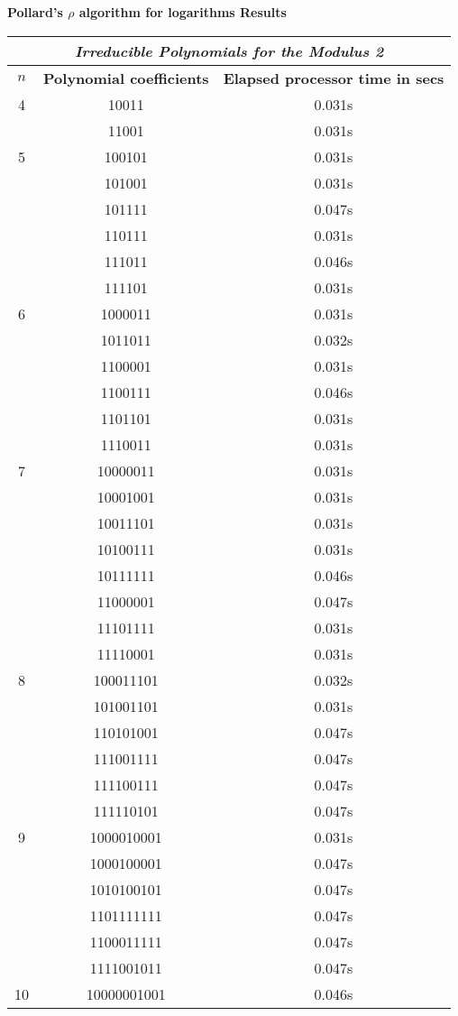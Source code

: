 \documentclass[iwp,first]{luthesis}
\begin{document}
\newpage

\textbf{Pollard's $\rho$ algorithm for logarithms Results}
\\
\begin{center}
\begin{tabular}{|c|c|c|}
\hline
\multicolumn{3}{|c|}{\textit{Irreducible Polynomials for the Modulus 2}} \\
\hline
\textbf{$n$} & \textbf{Polynomial coefficients} & \textbf{Elapsed processor time in secs} \\ \hline
4 & 10011 & 0.031s  \\ 
 & 11001 & 0.031s \\ \hline
5 & 100101 & 0.031s \\ 
 & 101001 & 0.031s \\
 & 101111 & 0.047s \\
 & 110111 & 0.031s \\
 & 111011 & 0.046s \\
 & 111101 & 0.031s \\ \hline
6 & 1000011 & 0.031s \\
 & 1011011 & 0.032s\\
 & 1100001 & 0.031s \\
 & 1100111 & 0.046s \\
 & 1101101 & 0.031s \\
 & 1110011 & 0.031s \\ \hline
7 & 10000011 & 0.031s \\
 & 10001001 & 0.031s \\
 & 10011101 & 0.031s \\
 & 10100111 & 0.031s \\
 & 10111111 & 0.046s \\
 & 11000001 & 0.047s \\
 & 11101111 & 0.031s \\
 & 11110001 & 0.031s \\ \hline
8 & 100011101 & 0.032s \\
 & 101001101 & 0.031s \\
 & 110101001 & 0.047s \\
 & 111001111 & 0.047s \\
 & 111100111 & 0.047s \\
 & 111110101 & 0.047s \\ \hline
9 & 1000010001 & 0.031s \\
 & 1000100001 & 0.047s \\
 & 1010100101 & 0.047s \\
 & 1101111111 & 0.047s \\
 & 1100011111 & 0.047s \\
 & 1111001011 & 0.047s \\ \hline
10 & 10000001001 & 0.046s\\
\hline
\end{tabular}
\end{center}
\end{document}
